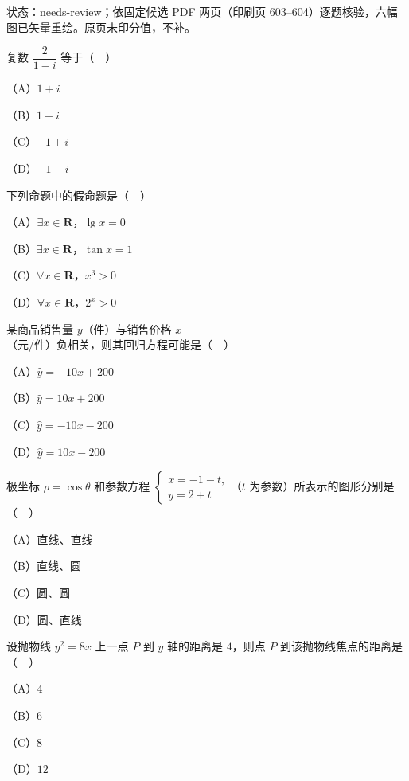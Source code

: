 状态：needs-review；依固定候选 PDF 两页（印刷页 603–604）逐题核验，六幅图已矢量重绘。原页未印分值，不补。
\begin{question}
复数 $\dfrac{2}{1-i}$ 等于（　）

（A）$1+i$

（B）$1-i$

（C）$-1+i$

（D）$-1-i$

\end{question}
\begin{question}
下列命题中的假命题是（　）

（A）$\exists x\in\mathbf R$，$\lg x=0$

（B）$\exists x\in\mathbf R$，$\tan x=1$

（C）$\forall x\in\mathbf R$，$x^3>0$

（D）$\forall x\in\mathbf R$，$2^x>0$

\end{question}
\begin{question}
某商品销售量 $y$（件）与销售价格 $x$（元/件）负相关，则其回归方程可能是（　）

（A）$\hat y=-10x+200$

（B）$\hat y=10x+200$

（C）$\hat y=-10x-200$

（D）$\hat y=10x-200$

\end{question}
\begin{question}
极坐标 $\rho=\cos\theta$ 和参数方程 $\begin{cases}x=-1-t,\\ y=2+t\end{cases}$（$t$ 为参数）所表示的图形分别是（　）

（A）直线、直线

（B）直线、圆

（C）圆、圆

（D）圆、直线

\end{question}
\begin{question}
设抛物线 $y^2=8x$ 上一点 $P$ 到 $y$ 轴的距离是 $4$，则点 $P$ 到该抛物线焦点的距离是（　）

（A）$4$

（B）$6$

（C）$8$

（D）$12$

\end{question}

